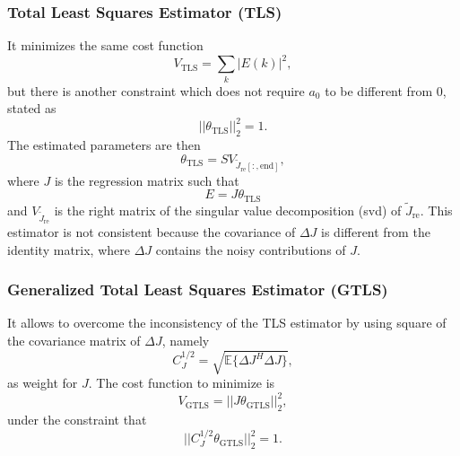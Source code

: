 \subsubsection{Total Least Squares Estimator (TLS)}

It minimizes the same cost function
\begin{equation}
    V_{\text{TLS}} = \sum_{k} |E(k)|^2,
\end{equation}
but there is another constraint which does not require $a_0$ to be different from $0$, stated as
\begin{equation}
    ||\theta_{\text{TLS}}||_2^2 = 1.
\end{equation}
The estimated parameters are then
\begin{equation}
    \theta_{\text{TLS}} = S V_{\tilde{J}_{\text{re}}[:,\text{end}]},
\end{equation}
where $J$ is the regression matrix such that
\begin{equation}
    E = J \theta_{\text{TLS}}
\end{equation}
and $V_{\tilde{J}_{\text{re}}}$ is the right matrix of the singular value decomposition (svd) of $\tilde{J}_{\text{re}}$. This estimator is not consistent because the covariance of $\Delta J$ is different from the identity matrix, where $\Delta J$ contains the noisy contributions of $J$.

\subsubsection{Generalized Total Least Squares Estimator (GTLS)}
\label{sec:GTLS}

It allows to overcome the inconsistency of the TLS estimator by using square of the covariance matrix of $\Delta J$, namely
\begin{equation}
    C_J^{1/2} = \sqrt{\mathbb{E} \Big\{ \Delta J^H \Delta J \Big\}},
\end{equation}
as weight for $J$. The cost function to minimize is
\begin{equation}
    V_{\text{GTLS}} = ||J \theta_{\text{GTLS}}||_2^2,
\end{equation}
under the constraint that
\begin{equation}
    ||C_J^{1/2} \theta_{\text{GTLS}}||_2^2 = 1.
\end{equation}

